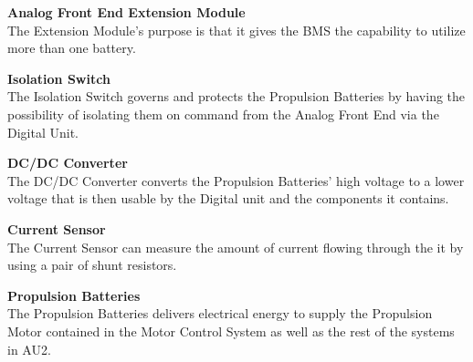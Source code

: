 \textbf{Analog Front End Extension Module}\\
The Extension Module's purpose is that it gives the BMS the capability to utilize more than one battery.

\textbf{Isolation Switch}\\
The Isolation Switch governs and protects the Propulsion Batteries by having the possibility of isolating them on command from the Analog Front End via the Digital Unit. 

\textbf{DC/DC Converter}\\
The DC/DC Converter converts the Propulsion Batteries' high voltage to a lower voltage that is then usable by the Digital unit and the components it contains.

\textbf{Current Sensor}\\
The Current Sensor can measure the amount of current flowing through the it by using a pair of shunt resistors. 

\textbf{Propulsion Batteries}\\
The Propulsion Batteries delivers electrical energy to supply the Propulsion Motor contained in the Motor Control System as well as the rest of the systems in AU2.